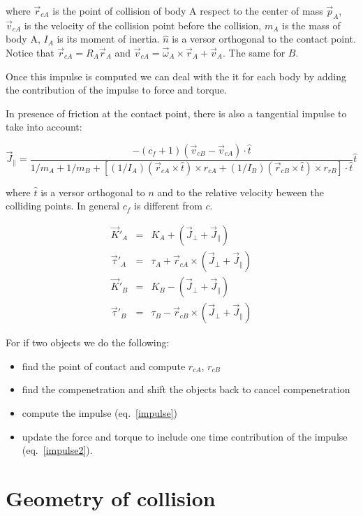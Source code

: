 \documentclass[12pt]{article}
\begin{document}
where $\vec r_{cA}$ is the point of collision of body A respect to the center of mass $\vec p_A$, $\vec v_{cA}$ is the velocity of the collision point before the collision, $m_A$ is the mass of body A, $I_A$ is its moment of inertia. $\hat n$ is a versor orthogonal to the contact point. Notice that $\vec r_{cA} = R_A\vec r_A$ and $\vec v_{cA} = \vec \omega_A \times \vec r_A + \vec v_A$. The same for $B$.

Once this impulse is computed we can deal with the it for each body by adding the contribution of the impulse to force and torque.

In presence of friction at the contact point, there is also a tangential impulse to take into account:

\begin{equation}
{\vec J}_{\parallel} = \frac{-(c_f+1) (\vec v_{cB} - \vec v_{cA}) \cdot \hat t}{1/m_A+1/m_B + \left[ (1/I_A)(\vec r_{cA} \times \hat t)\times r_{cA}  + (1/I_B)(\vec r_{cB} \times \hat t) \times r_{rB}\right] \cdot {\hat t}}{\hat t}
\label{impulse}
\end{equation}

where $\hat t$ is a versor orthogonal to $n$ and to the relative velocity beween the colliding points. In general $c_f$ is different from $c$.

\begin{eqnarray}
\vec K'_A &=& K_A + (\vec J_{\perp}+\vec J_{\parallel}) \\
\vec \tau'_A &=& \tau_A + \vec r_{cA} \times (\vec J_{\perp}+\vec J_{\parallel}) \\
\vec K'_B &=& K_B - (\vec J_{\perp}+\vec J_{\parallel}) \\
\vec \tau'_B &=& \tau_B - \vec r_{cB} \times (\vec J_{\perp}+\vec J_{\parallel}) 
\label{impulse2}
\end{eqnarray}

For if two objects we do the following:
\begin{itemize}
\item find the point of contact and compute $r_{cA}$, $r_{cB}$
\item find the compenetration and shift the objects back to cancel compenetration
\item compute the impulse (eq.~\ref{impulse})
\item update the force and torque to include one time contribution of the impulse (eq.~\ref{impulse2}).
\end{itemize}

\section{Geometry of collision}
\end{document}
